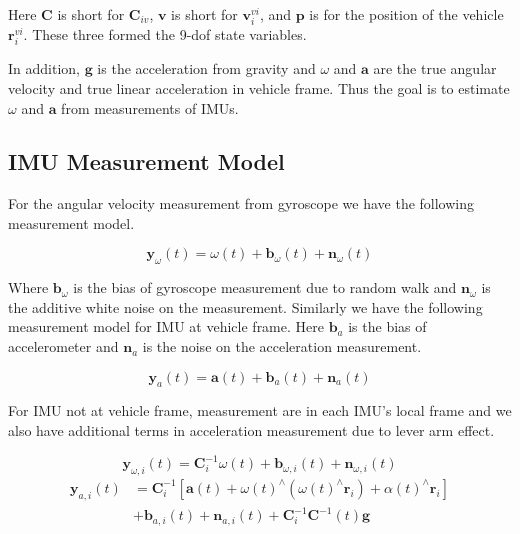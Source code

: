 \documentclass[conference]{IEEEtran}
\begin{document}
Here $\textbf{C}$ is short for $\textbf{C}_{iv}$, $\textbf{v}$ is short for $\textbf{v}_i^{vi}$, and $\textbf{p}$ is for the position of the vehicle $\textbf{r}_i^{vi}$. These three formed the 9-dof state variables.

In addition, $\textbf{g}$ is the acceleration from gravity and $\omega$ and $\textbf{a}$ are the true angular velocity and true linear acceleration in vehicle frame. Thus the goal is to estimate $\omega$ and $\textbf{a}$ from measurements of IMUs.

\subsection{IMU Measurement Model}

For the angular velocity measurement from gyroscope we have the following measurement model.

\begin{equation}
    \textbf{y}_\omega(t) = \omega(t) + \textbf{b}_\omega(t) + \textbf{n}_\omega(t)
\end{equation}

Where $\textbf{b}_\omega$ is the bias of gyroscope measurement due to random walk and $\textbf{n}_\omega$ is the additive white noise on the measurement. Similarly we have the following measurement model for IMU at vehicle frame. Here $\textbf{b}_a$ is the bias of accelerometer and $\textbf{n}_a$ is the noise on the acceleration measurement.

\begin{equation}
    \textbf{y}_a(t) = \textbf{a}(t) + \textbf{b}_a(t) + \textbf{n}_a(t)
\end{equation}

For IMU not at vehicle frame, measurement are in each IMU's local frame and we also have additional terms in acceleration measurement due to lever arm effect.

\begin{equation}
    \textbf{y}_{\omega, i}(t) = \textbf{C}_{i}^{-1} \omega(t) + \textbf{b}_{\omega, i}(t) + \textbf{n}_{\omega,i}(t)
\end{equation}
\begin{equation}
\begin{split}
    \textbf{y}_{a,i}(t) &= \textbf{C}_i^{-1} \left[ \textbf{a}(t) + \omega(t)^\wedge (\omega(t)^\wedge \textbf{r}_i) + \alpha(t)^\wedge \textbf{r}_i \right] \\
    &+ \textbf{b}_{a,i}(t) + \textbf{n}_{a,i}(t) + \textbf{C}_i^{-1} \textbf{C}^{-1}(t) \textbf{g}
\end{split}
\end{equation}
\end{document}
